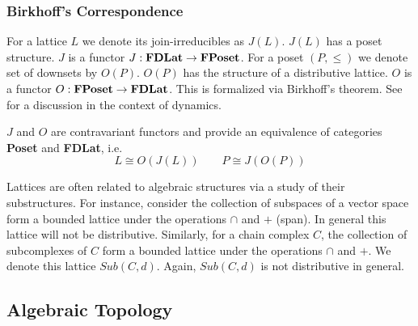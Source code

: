 %



\subsubsection{Birkhoff's Correspondence}

For a lattice $L$ we denote its join-irreducibles as $J(L)$.  $J(L)$ has a poset structure.  $J$ is a functor $J:{\bf FDLat}\to {\bf FPoset}$.  For a poset $(P,\leq)$ we denote set of downsets by $O(P)$. $O(P)$ has the structure of a distributive lattice.  $O$ is a functor $O:{\bf FPoset}\to {\bf FDLat}$.  This is formalized via Birkhoff's theorem.  See~\cite{lsa,lsa2,salamon} for a discussion in the context of dynamics.

\begin{thm}\label{thm:birkhoff}
$J$ and $O$ are contravariant functors and provide an equivalence of categories {\bf Poset} and {\bf FDLat}, i.e. $$L\cong O(J(L))\quad\quad P\cong J(O(P))$$

\end{thm}

Lattices are often related to algebraic structures via a study of their substructures.  For instance, consider the collection of subspaces of a vector space form a bounded lattice under the operations $\cap$ and $+$ (span). In general this lattice will not be distributive. Similarly, for a chain complex $C$, the collection of subcomplexes of $C$ form a bounded lattice under the operations $\cap$ and $+$.  We denote this lattice $Sub(C,d)$.  Again, $Sub(C,d)$ is not distributive in general.






\subsection{Algebraic Topology}\label{sec:prelims:AT}

